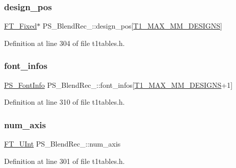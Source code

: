 \subsubsection{\texorpdfstring{design\_pos}{design\_pos}}
{\footnotesize\ttfamily \mbox{\hyperlink{fttypes_8h_a5f5a679cc09f758efdd0d1c5feed3c3d}{F\+T\+\_\+\+Fixed}}$\ast$ P\+S\+\_\+\+Blend\+Rec\+\_\+\+::design\+\_\+pos\mbox{[}\mbox{\hyperlink{t1tables_8h_a933ca229674aa312fd5546fadc95e08f}{T1\+\_\+\+M\+A\+X\+\_\+\+M\+M\+\_\+\+D\+E\+S\+I\+G\+NS}}\mbox{]}}



Definition at line 304 of file t1tables.\+h.

\mbox{\label{struct_p_s___blend_rec___ac5478cafc838257e693a9604edf1f5e9}} 
\subsubsection{\texorpdfstring{font\_infos}{font\_infos}}
{\footnotesize\ttfamily \mbox{\hyperlink{t1tables_8h_a413d5f096543f289c85f416f688ffc06}{P\+S\+\_\+\+Font\+Info}} P\+S\+\_\+\+Blend\+Rec\+\_\+\+::font\+\_\+infos\mbox{[}\mbox{\hyperlink{t1tables_8h_a933ca229674aa312fd5546fadc95e08f}{T1\+\_\+\+M\+A\+X\+\_\+\+M\+M\+\_\+\+D\+E\+S\+I\+G\+NS}}+1\mbox{]}}



Definition at line 310 of file t1tables.\+h.

\mbox{\label{struct_p_s___blend_rec___af9b375493ee2d450cabbc571473e4006}} 
\subsubsection{\texorpdfstring{num\_axis}{num\_axis}}
{\footnotesize\ttfamily \mbox{\hyperlink{fttypes_8h_abcb8db4dbf35d2b55a9e8c7b0926dc52}{F\+T\+\_\+\+U\+Int}} P\+S\+\_\+\+Blend\+Rec\+\_\+\+::num\+\_\+axis}



Definition at line 301 of file t1tables.\+h.

\mbox{\label{struct_p_s___blend_rec___afa5c7dd4206eb8a1d9ef4894abfc9555}} 

